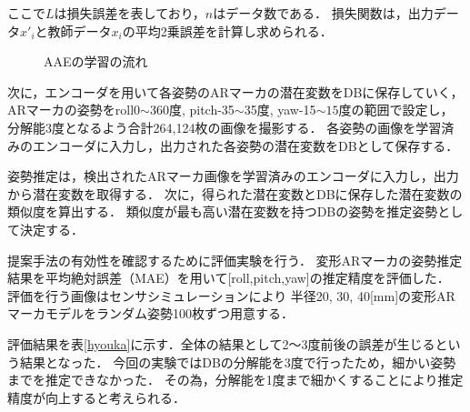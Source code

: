 \documentclass{jsarticle}
\begin{document}
ここで$L$は損失誤差を表しており，$n$はデータ数である．
損失関数は，出力データ$x'_i$と教師データ$x_i$の平均2乗誤差を計算し求められる．

\begin{figure}[ht]
\vspace{-1zh}
\setlength{\epsfxsize}{6.5cm}
\centerline{}
\vspace{0zh}
\caption{AAEの学習の流れ}
\label{BB}
\vspace{-2zh}
\end{figure}


次に，エンコーダを用いて各姿勢のARマーカの潜在変数をDBに保存していく，
ARマーカの姿勢をroll0$\sim$360度, pitch-35$\sim$35度, yaw-15$\sim15$度の範囲で設定し，
分解能3度となるよう合計264,124枚の画像を撮影する．
各姿勢の画像を学習済みのエンコーダに入力し，出力された各姿勢の潜在変数をDBとして保存する．

姿勢推定は，検出されたARマーカ画像を学習済みのエンコーダに入力し，出力から潜在変数を取得する．
次に，得られた潜在変数とDBに保存した潜在変数の類似度を算出する．
類似度が最も高い潜在変数を持つDBの姿勢を推定姿勢として決定する．








提案手法の有効性を確認するために評価実験を行う．
変形ARマーカの姿勢推定結果を平均絶対誤差（MAE）を用いて[roll,pitch,yaw]の推定精度を評価した．
評価を行う画像はセンサシミュレーションにより	
半径20, 30, 40[mm]の変形ARマーカモデルをランダム姿勢100枚ずつ用意する．

評価結果を表\ref{hyouka}に示す．全体の結果として2～3度前後の誤差が生じるという結果となった．
今回の実験ではDBの分解能を3度で行ったため，細かい姿勢までを推定できなかった．
その為，分解能を1度まで細かくすることにより推定精度が向上すると考えられる．
\end{document}
